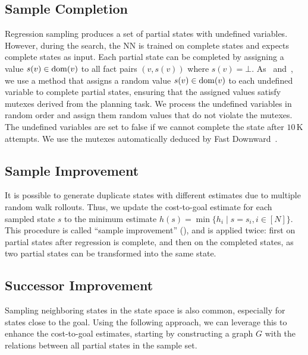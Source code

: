 \documentclass[ppgc,diss,english]{iiufrgs}
\begin{document}
\subsection{Sample Completion}
\label{sec:sample-completion}
Regression sampling produces a set of partial states with undefined variables. However, during the search, the NN is trained on complete states and expects complete states as input.
Each partial state can be completed by assigning a value $s(v)\in\operatorname{dom}(v)$ to all fact pairs $(v,s(v))$ where $s(v)=\bot$.
As~\citet{Bettker.etal/2022} and~\citet{Ferber.etal/2022}, we use a method that assigns a random value $s(v) \in \operatorname{dom}(v)$ to each undefined variable to complete partial states, ensuring that the assigned values satisfy mutexes derived from the planning task. We process the undefined variables in random order and assign them random values that do not violate the mutexes. The undefined variables are set to false if we cannot complete the state after $10$\,K attempts. We use the mutexes automatically deduced by Fast Downward~\cite{Helmert/2006,Helmert/2009}.



\subsection{Sample Improvement}
\label{sec:sample-sai}
It is possible to generate duplicate states with different estimates due to multiple random walk rollouts. Thus, we update the cost-to-goal estimate for each sampled state $s$ to the minimum estimate $h(s) = \min\{h_i \mid s=s_i, i\in[N]\}$.
This procedure is called ``sample improvement'' (\sai), and is applied twice: first on partial states after regression is complete, and then on the completed states, as two partial states can be transformed into the same state.

\subsection{Successor Improvement}
\label{sec:sample-sui}
Sampling neighboring states in the state space is also common, especially for states close to the goal. Using the following approach, we can leverage this to enhance the cost-to-goal estimates, starting by constructing a graph $G$ with the relations between all partial states in the sample set.
\end{document}
